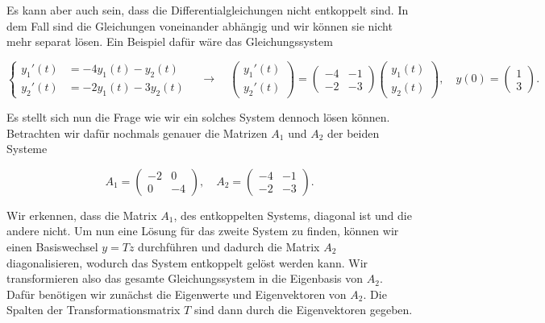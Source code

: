 Es kann aber auch sein, dass die Differentialgleichungen nicht entkoppelt sind. In dem Fall sind die Gleichungen voneinander abhängig und wir können sie nicht mehr separat lösen. Ein Beispiel dafür wäre das Gleichungssystem

\begin{equation*}
    \left\{ 
        \begin{aligned}
            y_1'(t) &= -4 y_1(t) - y_2(t) \\
            y_2'(t) &= -2 y_1(t) - 3 y_2(t)
        \end{aligned}
    \right. \quad \longrightarrow \quad
    \begin{pmatrix}
        y_1'(t) \\
        y_2'(t)
    \end{pmatrix} =
    \begin{pmatrix}
        -4 & -1 \\
        -2 & -3
    \end{pmatrix}
    \begin{pmatrix}
        y_1(t) \\
        y_2(t)
    \end{pmatrix}, \quad y(0)=
    \begin{pmatrix}
        1 \\
        3
    \end{pmatrix}.
\end{equation*}

Es stellt sich nun die Frage wie wir ein solches System dennoch lösen können. Betrachten wir dafür nochmals genauer die Matrizen \( A_1\) und \( A_2 \) der beiden Systeme

\begin{equation*}
    A_1 = \begin{pmatrix}
        -2 & 0 \\
        0 & -4
    \end{pmatrix}, \quad
    A_2 = \begin{pmatrix}
        -4 & -1 \\
        -2 & -3
    \end{pmatrix}.
\end{equation*}

Wir erkennen, dass die Matrix \( A_1 \), des entkoppelten Systems, diagonal ist und die andere nicht. Um nun eine Lösung für das zweite System zu finden, können wir einen Basiswechsel \( y = Tz \) durchführen und dadurch die Matrix \( A_2 \) diagonalisieren, wodurch das System entkoppelt gelöst werden kann. Wir transformieren also das gesamte Gleichungssystem in die Eigenbasis von \( A_2 \). Dafür benötigen wir zunächst die Eigenwerte und Eigenvektoren von \( A_2 \). Die Spalten der Transformationsmatrix \( T \) sind dann durch die Eigenvektoren gegeben.

